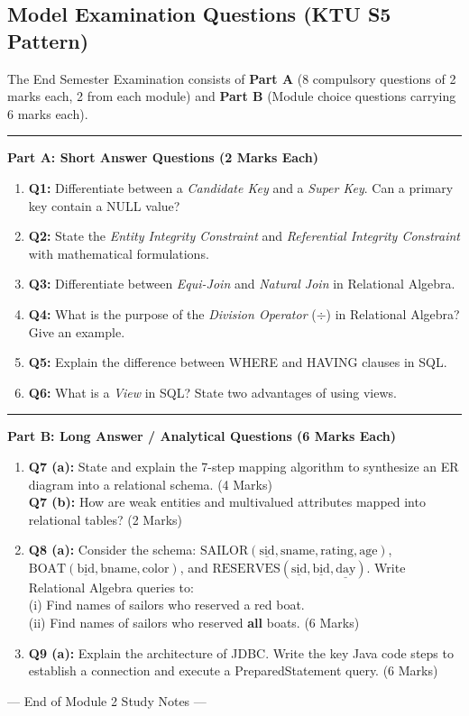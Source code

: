 \documentclass[11pt,a4paper]{article}
\newcommand{\ic}[1]{\mbox{\colorbox{AnthCodeBG}{\footnotesize\ttfamily\textcolor{AnthBlue}{#1}}}}
\newcommand{\concept}[1]{%
  \vspace{3pt}\noindent\textcolor{AnthGreen}{\rule{3.5pt}{10pt}}\enspace
  \textbf{\sffamily\color{AnthDark}#1}\par\vspace{2pt}%
}
\newenvironment{Warn}[1][Important Exam Alert]{\begin{tcolorbox}[warnbox, title=#1]}{\end{tcolorbox}}
\begin{document}
\subsection{Model Examination Questions (KTU S5 Pattern)}

\begin{Warn}[University Examination Pattern (PBEOT504 Scheme)]
The End Semester Examination consists of \textbf{Part A} (8 compulsory questions of 2 marks each, 2 from each module) and \textbf{Part B} (Module choice questions carrying 6 marks each).
\end{Warn}

\concept{Part A: Short Answer Questions (2 Marks Each)}
\begin{enumerate}
  \item \textbf{Q1:} Differentiate between a \emph{Candidate Key} and a \emph{Super Key}. Can a primary key contain a NULL value?
  \item \textbf{Q2:} State the \emph{Entity Integrity Constraint} and \emph{Referential Integrity Constraint} with mathematical formulations.
  \item \textbf{Q3:} Differentiate between \emph{Equi-Join} and \emph{Natural Join} in Relational Algebra.
  \item \textbf{Q4:} What is the purpose of the \emph{Division Operator} ($\div$) in Relational Algebra? Give an example.
  \item \textbf{Q5:} Explain the difference between \ic{WHERE} and \ic{HAVING} clauses in SQL.
  \item \textbf{Q6:} What is a \emph{View} in SQL? State two advantages of using views.
\end{enumerate}

\concept{Part B: Long Answer / Analytical Questions (6 Marks Each)}
\begin{enumerate}
  \item \textbf{Q7 (a):} State and explain the 7-step mapping algorithm to synthesize an ER diagram into a relational schema. \hfill (4 Marks) \\
  \textbf{Q7 (b):} How are weak entities and multivalued attributes mapped into relational tables? \hfill (2 Marks)
  
  \item \textbf{Q8 (a):} Consider the schema: $\text{SAILOR}(\underline{\text{sid}}, \text{sname}, \text{rating}, \text{age})$, $\text{BOAT}(\underline{\text{bid}}, \text{bname}, \text{color})$, and $\text{RESERVES}(\underline{\text{sid}}, \underline{\text{bid}}, \underline{\text{day}})$. Write Relational Algebra queries to: \\
  (i) Find names of sailors who reserved a red boat. \\
  (ii) Find names of sailors who reserved \textbf{all} boats. \hfill (6 Marks)

  \item \textbf{Q9 (a):} Explain the architecture of JDBC. Write the key Java code steps to establish a connection and execute a \ic{PreparedStatement} query. \hfill (6 Marks)
\end{enumerate}

\vfill
\begin{center}
\small\sffamily\color{AnthMidGray}
--- End of Module 2 Study Notes ---
\end{center}
\end{document}
